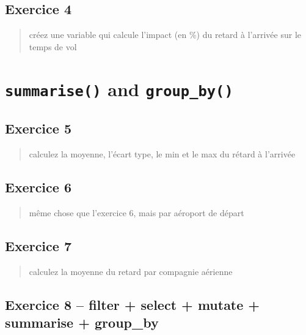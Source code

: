 \documentclass[
]{article}
\begin{document}
\hypertarget{exercice-4}{%
\subsection{Exercice 4}\label{exercice-4}}

\begin{quote}
créez une variable qui calcule l'impact (en \%) du retard à l'arrivée
sur le temps de vol
\end{quote}

\hypertarget{summarise-and-group_by}{%
\section{\texorpdfstring{\texttt{summarise()} and
\texttt{group\_by()}}{summarise() and group\_by()}}\label{summarise-and-group_by}}

\hypertarget{exercice-5}{%
\subsection{Exercice 5}\label{exercice-5}}

\begin{quote}
calculez la moyenne, l'écart type, le min et le max du rétard à
l'arrivée
\end{quote}

\hypertarget{exercice-6}{%
\subsection{Exercice 6}\label{exercice-6}}

\begin{quote}
même chose que l'exercice 6, mais par aéroport de départ
\end{quote}

\hypertarget{exercice-7}{%
\subsection{Exercice 7}\label{exercice-7}}

\begin{quote}
calculez la moyenne du retard par compagnie aérienne
\end{quote}

\hypertarget{exercice-8-filter-select-mutate-summarise-group_by}{%
\subsection{Exercice 8 -- filter + select + mutate + summarise +
group\_by}\label{exercice-8-filter-select-mutate-summarise-group_by}}
\end{document}

